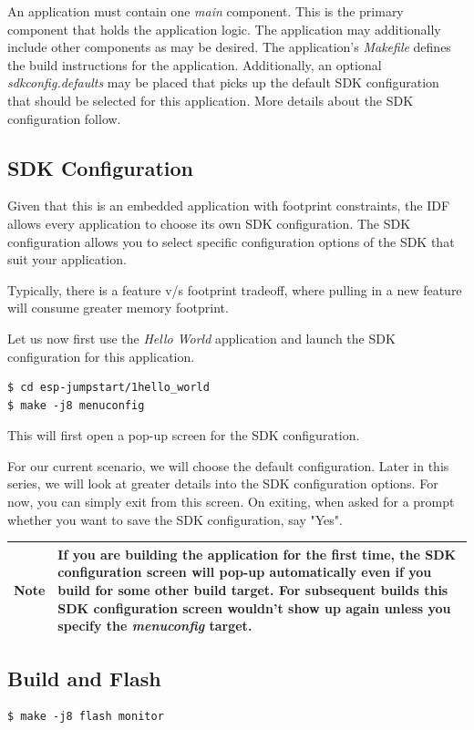 \documentclass[11pt,fleqn]{book} %
\newcommand{\ksnotebox}[1]{\begin{tabularx}{\textwidth}{ |c|X| }
\hline
\cellcolor{lightgray} \textbf{Note} & #1 \\
\hline
\end{tabularx}} %
\begin{document}
An application must contain one \textit{main} component. This is the primary component that holds the application logic. The application may additionally include other components as may be desired.
The application's \textit{Makefile} defines the build instructions for the application. 
Additionally, an optional \textit{sdkconfig.defaults} may be placed that picks up the default SDK configuration that should be selected for this application. More details about the SDK configuration follow.

\subsection{SDK Configuration}

Given that this is an embedded application with footprint constraints, the IDF allows every application to choose its own SDK configuration. The SDK configuration allows you to select specific configuration options of the SDK that suit your application.

Typically, there is a feature v/s footprint tradeoff, where pulling in a new feature will consume greater memory footprint.

Let us now first use the \textit{Hello World} application and launch the SDK configuration for this application.

\begin{verbatim}
$ cd esp-jumpstart/1hello_world
$ make -j8 menuconfig
\end{verbatim}

This will first open a pop-up screen for the SDK configuration.

For our current scenario, we will choose the default configuration. Later in this series, we will look at greater details into the SDK configuration options. For now, you can simply exit from this screen. On exiting, when asked for a prompt whether you want to save the SDK configuration, say "Yes".

\ksnotebox{If you are building the application for the first time, the SDK configuration screen will pop-up automatically even if you build for some other build target. For subsequent builds this SDK configuration screen wouldn't show up again unless you specify the \textit{menuconfig} target.}

\subsection{Build and Flash}
\begin{verbatim}
$ make -j8 flash monitor
\end{verbatim}
\end{document}
